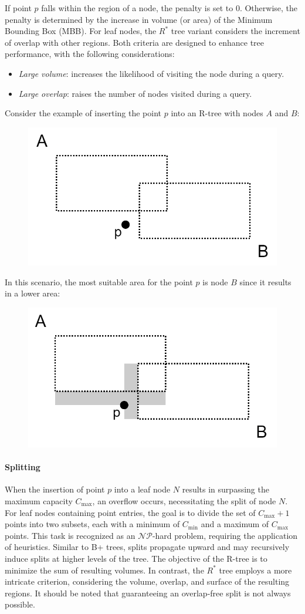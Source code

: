 If point $p$ falls within the region of a node, the penalty is set to 0. 
Otherwise, the penalty is determined by the increase in volume (or area) of the Minimum Bounding Box (MBB).
For leaf nodes, the $R^{*}$ tree variant considers the increment of overlap with other regions.
Both criteria are designed to enhance tree performance, with the following considerations:
\begin{itemize}
    \item \textit{Large volume}: increases the likelihood of visiting the node during a query.
    \item \textit{Large overlap}: raises the number of nodes visited during a query.
\end{itemize}
\begin{example}
    Consider the example of inserting the point $p$ into an R-tree with nodes $A$ and $B$:
    \begin{figure}[H]
        \centering
        \includegraphics[width=0.4\linewidth]{images/r1.png}
    \end{figure}
    In this scenario, the most suitable area for the point $p$ is node $B$ since it results in a lower area:
    \begin{figure}[H]
        \centering
        \includegraphics[width=0.4\linewidth]{images/r2.png}
    \end{figure}
\end{example}

\paragraph*{Splitting}
When the insertion of point $p$ into a leaf node $N$ results in surpassing the maximum capacity $C_{\text{max}}$, an overflow occurs, necessitating the split of node $N$.
For leaf nodes containing point entries, the goal is to divide the set of $C_{\text{max}}+1$ points into two subsets, each with a minimum of $C_{\text{min}}$ and a maximum of $C_{\text{max}}$ points.
This task is recognized as an $\mathcal{NP}$-hard problem, requiring the application of heuristics. 
Similar to B+ trees, splits propagate upward and may recursively induce splits at higher levels of the tree. 
The objective of the R-tree is to minimize the sum of resulting volumes.
In contrast, the $R^{*}$ tree employs a more intricate criterion, considering the volume, overlap, and surface of the resulting regions.
It should be noted that guaranteeing an overlap-free split is not always possible.

